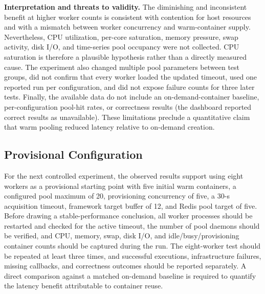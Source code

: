 \textbf{Interpretation and threats to validity.} The diminishing and inconsistent benefit at higher worker counts is consistent with contention for host resources and with a mismatch between worker concurrency and warm-container supply. Nevertheless, CPU utilization, per-core saturation, memory pressure, swap activity, disk I/O, and time-series pool occupancy were not collected. CPU saturation is therefore a plausible hypothesis rather than a directly measured cause. The experiment also changed multiple pool parameters between test groups, did not confirm that every worker loaded the updated timeout, used one reported run per configuration, and did not expose failure counts for three later tests. Finally, the available data do not include an on-demand-container baseline, per-configuration pool-hit rates, or correctness results (the dashboard reported correct results as unavailable). These limitations preclude a quantitative claim that warm pooling reduced latency relative to on-demand creation.

\subsection{Provisional Configuration}
For the next controlled experiment, the observed results support using eight workers as a provisional starting point with five initial warm containers, a configured pool maximum of 20, provisioning concurrency of five, a 30-s acquisition timeout, framework target buffer of 12, and Redis pool target of five. Before drawing a stable-performance conclusion, all worker processes should be restarted and checked for the active timeout, the number of pool daemons should be verified, and CPU, memory, swap, disk I/O, and idle/busy/provisioning container counts should be captured during the run. The eight-worker test should be repeated at least three times, and successful executions, infrastructure failures, missing callbacks, and correctness outcomes should be reported separately. A direct comparison against a matched on-demand baseline is required to quantify the latency benefit attributable to container reuse.
